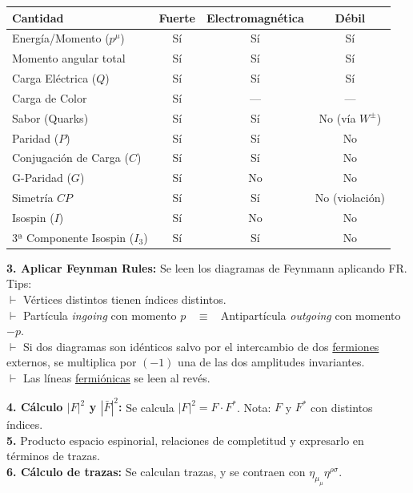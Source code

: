 {
\centering
\begin{center}
\begin{tabular}{|l|c|c|c|}
\hline
\textbf{Cantidad} & \textbf{Fuerte} & \textbf{Electromagnética} & \textbf{Débil} \\ \hline
Energía/Momento ($p^\mu$) & Sí & Sí & Sí \\ \hline
Momento angular total & Sí & Sí & Sí \\ \hline

Carga Eléctrica ($Q$) & Sí & Sí & Sí \\ \hline
Carga de Color & Sí & --- & --- \\ \hline
Sabor (Quarks) & Sí & Sí & No (vía $W^\pm$) \\ \hline
Paridad ($P$) & Sí & Sí & No \\ \hline
Conjugación de Carga ($C$) & Sí & Sí & No \\ \hline
G-Paridad ($G$) & Sí & No & No \\ \hline
Simetría $CP$ & Sí & Sí & No (violación) \\ \hline
Isospin ($I$) & Sí & No & No \\ \hline
3ª Componente Isospin ($I_3$) & Sí & Sí & No \\ \hline
\end{tabular}
\end{center}

}


\textbf{3. Aplicar Feynman Rules:} Se leen los diagramas de Feynmann aplicando FR. Tips:\\
$\vdash$ Vértices distintos tienen índices distintos.\\
$\vdash$ Partícula \textit{ingoing} con momento $p$ $\;\; \equiv \;\; $ Antipartícula \textit{outgoing} con momento $-p$.\\
$\vdash$ Si dos diagramas son idénticos salvo por el intercambio de dos \underline{fermiones} externos, se multiplica por $(-1)$ una de las dos amplitudes invariantes.\\
$\vdash$ Las líneas \underline{fermiónicas} se leen al revés.

\textbf{4. Cálculo $|F|^2$ y $|\bar{F}|^2$:} Se calcula $|F|^2 = F\cdot F^*$. Nota: $F$ y $F^*$ con distintos 
índices.\\

\textbf{5.} Producto espacio espinorial, relaciones de completitud y expresarlo en términos de trazas.\\

\textbf{6. Cálculo de trazas:} Se calculan trazas, y se contraen con $\eta_{\mu_\mu} \eta ^{\rho \sigma}$.\\

